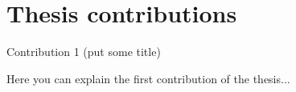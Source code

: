 \section{Thesis contributions}

\begin{contribution}{Contribution 1 (put some title)}

Here you can explain the first contribution of the thesis...
 
\end{contribution}